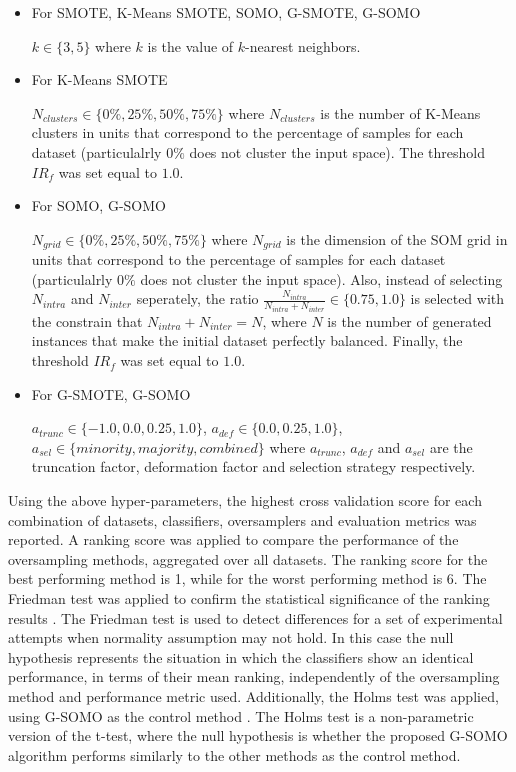 \documentclass[parskip=full]{scrartcl}
\begin{document}
\begin{itemize}

	\renewcommand\labelitemi{--}

	\item For SMOTE, K-Means SMOTE, SOMO, G-SMOTE, G-SOMO
	
	$k \in \{3, 5 \}$ where $k$ is the value of $k$-nearest neighbors.

	\item For K-Means SMOTE
	
	$ N_{clusters} \in \{0\%, 25\%, 50\%, 75\% \} $ where $N_{clusters}$ is the number of K-Means clusters in units that correspond to the percentage of samples for each dataset (particulalrly $ 0\% $ does not cluster the input space). The threshold $ IR_{f} $ was set equal to $ 1.0 $.

	\item For SOMO, G-SOMO

	$ N_{grid} \in \{0\%, 25\%, 50\%, 75\% \} $ where $N_{grid}$ is the dimension of the SOM grid in units that correspond to the percentage of samples for each dataset (particulalrly $ 0\% $ does not cluster the input space). Also, instead of selecting $N_{intra}$ and $N_{inter}$ seperately, the ratio $ \frac{N_{intra}}{N_{intra} + N_{inter}} \in \{0.75, 1.0 \} $ is selected with the constrain that $N_{intra} + N_{inter} = N$, where $N$ is the number of generated instances that make the initial dataset perfectly balanced. Finally, the threshold $ IR_{f} $ was set equal to $ 1.0 $.

	\item For G-SMOTE, G-SOMO
	
	$ a_{trunc} \in \{-1.0, 0.0, 0.25, 1.0\} $, $ a_{def} \in \{0.0, 0.25, 1.0\} $,  $ a_{sel} \in \{ minority, majority, combined \} $ where $a_{trunc}$, $a_{def}$ and $a_{sel}$ are the truncation factor, deformation factor and selection strategy respectively.

\end{itemize}

Using the above hyper-parameters, the highest cross validation score for each combination of datasets, classifiers, oversamplers and evaluation metrics was reported. A ranking score was applied to compare the performance of the oversampling methods, aggregated over all datasets. The ranking score for the best performing method is 1, while for the worst performing method is 6. The Friedman test was applied to confirm the statistical significance of the ranking results \cite{Guyon2003}. The Friedman test is used to detect differences for a set of experimental attempts when normality assumption may not hold. In this case the null hypothesis represents the situation in which the classifiers show an identical performance, in terms of their mean ranking, independently of the oversampling method and performance metric used. Additionally, the Holms test was applied, using G-SOMO as the control method \cite{Guyon2003}. The Holms test is a non-parametric version of the t-test, where the null hypothesis is whether the proposed G-SOMO algorithm performs similarly to the other methods as the control method.
\end{document}
